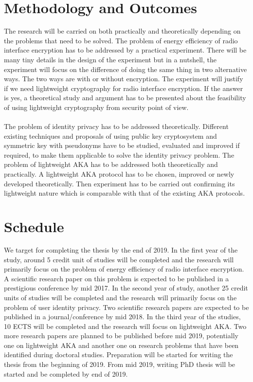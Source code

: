 \documentclass[14pt]{article}
\begin{document}
\begin{enumerate}
\section*{Methodology and Outcomes}
The research will be carried on both practically and theoretically depending on the problems that need to be solved. The problem of energy efficiency of radio interface encryption has to be addressed by a practical experiment. There will be many tiny details in the design of the experiment but in a nutshell, the experiment will focus on the difference of doing the same thing in two alternative ways. The two ways are with or without encryption. The experiment will justify if we need lightweight cryptography for radio interface encryption. If the answer is yes, a theoretical study and argument has to be presented about the feasibility of using lightweight cryptography from security point of view. \paragraph{} The problem of identity privacy has to be addressed theoretically. Different existing techniques and proposals of using public key cryptosystem and symmetric key with pseudonyms have to be studied, evaluated and improved if required, to make them applicable to solve the identity privacy problem. The problem of lightweight AKA has to be addressed both theoretically and practically. A lightweight AKA protocol has to be chosen, improved or newly developed theoretically. Then experiment has to be carried out confirming its lightweight nature which is comparable with that of the existing AKA protocols.


\section*{Schedule}
We target for completing the thesis by the end of 2019. In the first year of the study, around 5 credit unit of studies will be completed and the research will primarily focus on the problem of energy efficiency of radio interface encryption. A scientific research paper on this problem is expected to be published in a prestigious conference by mid 2017. In the second year of study, another 25 credit units of studies will be completed and the research will primarily focus on the problem of user identity privacy. Two scientific research papers are expected to be published in a journal/conference by mid 2018. In the third year of the studies, 10 ECTS will be completed and the research will focus on lightweight AKA. Two more research papers are planned to be published before mid 2019, potentially one on lightweight AKA and another one on research problems that have been identified during doctoral studies. Preparation will be started for writing the thesis from the beginning of 2019. From mid 2019, writing PhD thesis will be started and be completed by end of 2019.


\end{enumerate}
\end{document}
